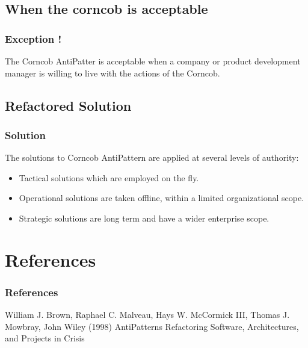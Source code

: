 \documentclass{beamer}
\begin{document}
\subsection{When the corncob is acceptable}
\begin{frame}
\frametitle{Exception !}
The Corncob AntiPatter is acceptable when a company or product development manager is willing to live with the actions of the Corncob.
\end{frame}

\subsection{Refactored Solution}
\begin{frame}
\frametitle{Solution}
The solutions to Corncob AntiPattern are applied at several levels of authority:
\begin{itemize}
\item Tactical solutions which are employed on the fly.
\item Operational solutions are taken offline, within a limited organizational scope.
\item Strategic solutions are long term and have a wider enterprise scope.
\end{itemize}
\end{frame}

\section{References}
\begin{frame}
\frametitle{References}
\footnotesize{
\begin{thebibliography}{99} %
 William J. Brown, Raphael C. Malveau, Hays W. McCormick III, Thomas J. Mowbray, John Wiley (1998)
\newblock AntiPatterns
Refactoring Software, Architectures, and Projects in Crisis

\end{thebibliography}
}
\end{frame}
\end{document}

